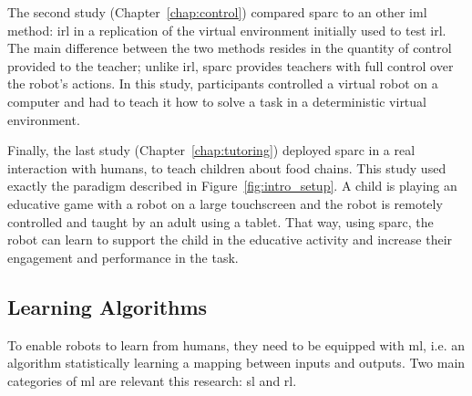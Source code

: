 The second study (Chapter~\ref{chap:control}) compared \gls{sparc} to an other \gls{iml} method: \gls{irl} in a replication of the virtual environment initially used to test \gls{irl}. The main difference between the two methods resides in the quantity of control provided to the teacher; unlike \gls{irl}, \gls{sparc} provides teachers with full control over the robot's actions. In this study, participants controlled a virtual robot on a computer and had to teach it how to solve a task in a deterministic virtual environment.

Finally, the last study (Chapter~\ref{chap:tutoring}) deployed \gls{sparc} in a real interaction with humans, to teach children about food chains. This study used exactly the paradigm described in Figure~\ref{fig:intro_setup}. A child is playing an educative game with a robot on a large touchscreen and the robot is remotely controlled and taught by an adult using a tablet. That way, using \gls{sparc}, the robot can learn to support the child in the educative activity and increase their engagement and performance in the task.

%
%
%
%
%

\subsection{Learning Algorithms}
To enable robots to learn from humans, they need to be equipped with \acrfull{ml}, i.e. an algorithm statistically learning a mapping between inputs and outputs. Two main categories of \gls{ml} are relevant this research: \gls{sl} and \gls{rl}.

